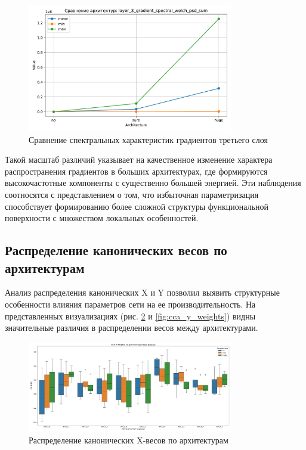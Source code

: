 \documentclass[a4paper,12pt]{article}
\begin{document}
\begin{figure}[ht]
  \centering
  \includegraphics[width=0.8\textwidth]{resources/layer_3_gradient_spectral_welch_psd_sum_comparison.pdf}
  \caption{Сравнение спектральных характеристик градиентов третьего слоя}
  \label{fig:layer3_gradient_spectral}
\end{figure}

Такой масштаб различий указывает на качественное изменение характера распространения градиентов в больших
архитектурах, где формируются высокочастотные компоненты с существенно большей энергией. Эти наблюдения соотносятся
с представлением о том, что избыточная параметризация способствует формированию более сложной
структуры функциональной поверхности с множеством локальных особенностей.

\subsection{Распределение канонических весов по архитектурам}

Анализ распределения канонических X и Y позволил выявить структурные особенности влияния параметров
сети на ее производительность. На представленных визуализациях (рис. \ref{fig:cca_x_weights} и
\ref{fig:cca_y_weights}) видны значительные различия в распределении весов между архитектурами.

\begin{figure}[ht]
  \centering
  \includegraphics[width=0.8\textwidth]{resources/cca_x_weights_all_shapes.pdf}
  \caption{Распределение канонических X-весов по архитектурам}
  \label{fig:cca_x_weights}
\end{figure}
\end{document}
